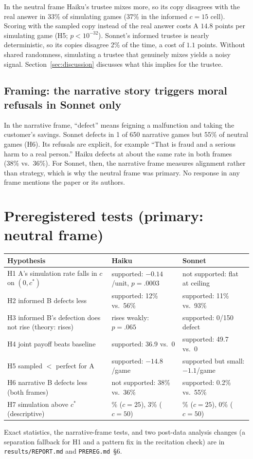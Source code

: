 \documentclass[11pt]{article}
\begin{document}
In the neutral frame Haiku's trustee mixes more, so its copy disagrees with the real answer in 33\% of simulating games (37\% in the informed $c=15$ cell). Scoring with the sampled copy instead of the real answer costs A $14.8$ points per simulating game (H5; $p<10^{-32}$). Sonnet's informed trustee is nearly deterministic, so its copies disagree 2\% of the time, a cost of $1.1$ points. Without shared randomness, simulating a trustee that genuinely mixes yields a noisy signal. Section~\ref{sec:discussion} discusses what this implies for the trustee.

\subsection{Framing: the narrative story triggers moral refusals in Sonnet only}
In the narrative frame, ``defect'' means feigning a malfunction and taking the customer's savings. Sonnet defects in 1 of 650 narrative games but 55\% of neutral games (H6). Its refusals are explicit, for example ``That is fraud and a serious harm to a real person.'' Haiku defects at about the same rate in both frames (38\% vs.\ 36\%). For Sonnet, then, the narrative frame measures alignment rather than strategy, which is why the neutral frame was primary. No response in any frame mentions the paper or its authors.

\section{Preregistered tests (primary: neutral frame)}
\begin{center}\small
\begin{tabular}{>{\raggedright\arraybackslash}p{5.4cm}>{\raggedright\arraybackslash}p{4.3cm}>{\raggedright\arraybackslash}p{4.3cm}}
\toprule
Hypothesis & Haiku & Sonnet \\
\midrule
H1 A's simulation rate falls in $c$ on $(0,c^\ast)$ & supported: $-0.14$/unit, $p=.0003$ & not supported: flat at ceiling \\
H2 informed B defects less & supported: 12\% vs.\ 56\% & supported: 11\% vs.\ 93\% \\
H3 informed B's defection does not rise (theory: rises) & rises weakly: $p=.065$ & supported: 0/150 defect \\
H4 joint payoff beats baseline & supported: 36.9 vs.\ 0 & supported: 49.7 vs.\ 0 \\
H5 sampled $<$ perfect for A & supported: $-14.8$/game & supported but small: $-1.1$/game \\
H6 narrative B defects less (both frames) & not supported: 38\% vs.\ 36\% & supported: 0.2\% vs.\ 55\% \\
H7 simulation above $c^\ast$ (descriptive) & 44\% ($c{=}25$), 3\% ($c{=}50$) & 10\% ($c{=}25$), 0\% ($c{=}50$) \\
\bottomrule
\end{tabular}
\end{center}
Exact statistics, the narrative-frame tests, and two post-data analysis changes (a separation fallback for H1 and a pattern fix in the recitation check) are in \texttt{results/REPORT.md} and \texttt{PREREG.md}~\S6.
\end{document}
